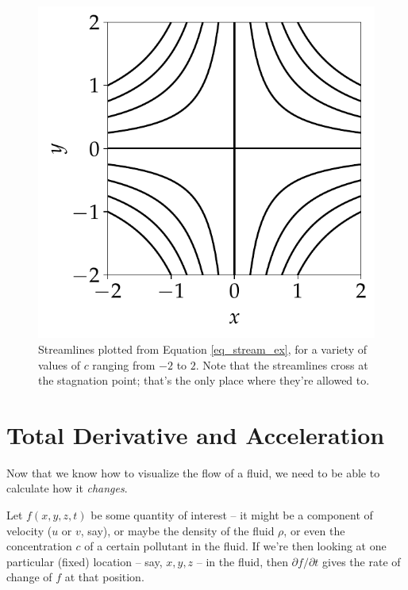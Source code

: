 \begin{figure}[t]
\centering\includegraphics[width=0.5\linewidth]{Figures/Chapter1/fig_streamline_example}
\caption{Streamlines plotted from Equation \ref{eq_stream_ex}, for a variety of values of $c$ ranging from $-2$ to $2$.  Note that the streamlines cross at the stagnation point; that's the only place where they're allowed to.}
\label{fig_streamline_example}
\end{figure}







\section{Total Derivative and Acceleration}

Now that we know how to visualize the flow of a fluid, we need to be able to calculate how it \emph{changes}.  

Let $f(x, y, z, t)$ be some quantity of interest -- it might be a component of velocity ($u$ or $v$, say), or maybe the density of the fluid $\rho$, or even the concentration $c$ of a certain pollutant in the fluid.  If we're then looking at one particular (fixed) location -- say, $x, y, z$ -- in the fluid, then $\partial f / \partial t$ gives the rate of change of $f$ at that position.

